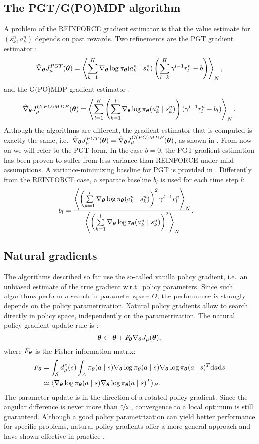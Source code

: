 \subsection{The PGT/G(PO)MDP algorithm}
A problem of the REINFORCE gradient estimator is that the value estimate for $(s_k^n,a_k^n)$ depends on past rewards. Two refinements are the PGT gradient estimator \cite{Sutton2000policy}:
\[
	\hat{\nabla}_{\boldsymbol{\theta}}J_{\mu}^{PGT}(\boldsymbol{\theta}) = 
		\left\langle
		\sum\limits_{k=1}^H\nabla_{\boldsymbol{\theta}}\log\pi_{\boldsymbol{\theta}}(a_k^n \mid s_k^n)
		\left(\sum\limits_{l=k}^H\gamma^{l-1}r_l^n-b\right)\right\rangle_N,
\]
and the G(PO)MDP gradient estimator \cite{Baxter2001infinite}:
\[
	\hat{\nabla}_{\boldsymbol{\theta}}J_{\mu}^{G(PO)MDP}(\boldsymbol{\theta}) = 
			\left\langle
			\sum\limits_{l=1}^H\left(\sum\limits_{k=1}^l
			\nabla_{\boldsymbol{\theta}}\log\pi_{\boldsymbol{\theta}}(a_k^n \mid s_k^n)\right)
			(\gamma^{l-1}r_l^n-b_l)\right\rangle_N.
\]
Although the algorithms are different, the gradient estimator that is computed is exactly the same, i.e.\ $\hat{\nabla}_{\boldsymbol{\theta}}J_{\mu}^{PGT}(\boldsymbol{\theta}) = \hat{\nabla}_{\boldsymbol{\theta}}J_{\mu}^{G(PO)MDP}(\boldsymbol{\theta})$, as shown in \cite{Peters2008reinf}. From now on we will refer to the PGT form.
In the case $b=0$, the PGT gradient estimation has been proven to suffer from less variance than REINFORCE \cite{Zhao2011a} under mild assumptions. A variance-minimizing baseline for PGT is provided in \cite{Peters2008reinf}. Differently from the REINFORCE case, a separate baseline $b_l$ is used for each time step $l$:
\begin{align*}
	b_l &= \frac{\left\langle\left(\sum\limits_{k=1}^l\nabla_{\boldsymbol{\theta}}\log\pi_{\boldsymbol{\theta}}(a_k^n \mid s_k^n)\right)^2
		\gamma^{l-1}r_l^n\right\rangle_N}
		{\left\langle\left(\sum\limits_{k=1}^l\nabla_{\boldsymbol{\theta}}\log\pi_{\boldsymbol{\theta}}(a_k^n \mid s_k^n)\right)^2
		\right\rangle_N}.
\end{align*}


\subsection{Natural gradients}
The algorithms described so far use the so-called vanilla policy gradient, i.e.\ an unbiased estimate of the true gradient w.r.t.\ policy parameters.
Since such algorithms perform a search in parameter space $\Theta$, the performance is strongly depends on the policy parametrization.
Natural policy gradients allow to search directly in policy space, independently on the parametrization. The natural policy gradient update rule is \cite{Kakade:2001}:
\[
	\boldsymbol{\theta} \gets \boldsymbol{\theta} + F_{\boldsymbol{\theta}}\nabla_{\boldsymbol{\theta}}J_\mu(\boldsymbol{\theta}),
\]
where $F_{\boldsymbol{\theta}}$ is the Fisher information matrix:
\begin{align*}
	F_{\boldsymbol{\theta}} &= \int_{\mathcal{S}}d_{\mu}^{\pi}(s)
			\int_{\mathcal{A}}\pi_{\boldsymbol{\theta}}(a \mid s)\nabla_{\boldsymbol{\theta}}\log\pi_{\boldsymbol{\theta}}(a \mid s)
			\nabla_{\boldsymbol{\theta}}\log\pi_{\boldsymbol{\theta}}(a \mid s)^T\mathrm{d}a\mathrm{d}s \\
			&\simeq \langle\nabla_{\boldsymbol{\theta}}\log\pi_{\boldsymbol{\theta}}(a \mid s)\nabla_{\boldsymbol{\theta}}\log\pi_{\boldsymbol{\theta}}(a \mid s)^T\rangle_H.
\end{align*}
The parameter update is in the direction of a rotated policy gradient. Since the angular difference is never more than $\nicefrac{\pi}{2}$ \cite{Amari1998natural}, convergence to a local optimum is still guaranteed. 
Although a good policy parametrization can yield better performance for specific problems, natural policy gradients offer a more general approach and have shown effective in practice \cite{Peters2008natural}.

